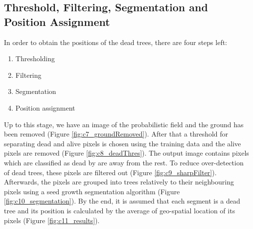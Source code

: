 \documentclass{subfiles}
\begin{document}
 


 \subsection{Threshold, Filtering, Segmentation and Position Assignment }\label{sec:Segmentation}

  \par In order to obtain the positions of the dead trees, there are four steps left:
  \begin{enumerate}
  	\item Thresholding 
  	\item Filtering
  	\item Segmentation
  	\item Position assignment 
  \end{enumerate}
  
  \par Up to this stage, we have an image of the probabilistic field and the ground has been removed (Figure \ref{fig:c7_groundRemoved}). After that a threshold for separating dead and alive pixels is chosen using the training data and the alive pixels are removed (Figure \ref{fig:c8_deadThres}). The output image contains pixels which are classified as dead by are away from the rest. To reduce over-detection of dead trees, these pixels are filtered out (Figure \ref{fig:c9_sharpFilter}). Afterwards, the pixels are grouped into trees relatively to their neighbouring pixels using a seed growth segmentation algorithm (Figure \ref{fig:c10_segmentation}). By the end, it is assumed that each segment is a dead tree and its position is calculated by the average of geo-spatial location of its pixels (Figure \ref{fig:c11_results}). 
 
 
\end{document}
